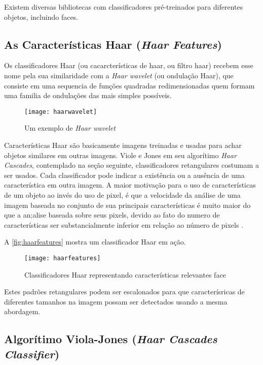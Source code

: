 Existem diversas bibliotecas com classificadores pré-treinados para diferentes objetos, incluindo faces.


\subsection{As Características Haar (\textit{Haar Features}) }\label{subsubsec:elem_haar}

Os classificadores Haar (ou cacarcterísticas de haar, ou filtro haar) recebem esse nome pela sua similaridade com a \textit{Haar wavelet} (ou ondulação Haar), que consiste em uma sequencia de funções quadradas redimensionadas quem formam uma familia de ondulações das mais simples possíveis.

 \begin{figure}[h]
 	\centering
 	\texttt{[image: haarwavelet]}
 	\caption{Um exemplo de \textit{Haar wavelet}}
 	\label{fig:haarwavelet}
 \end{figure}

Características Haar são basicamente imagens treinadas e usadas para achar objetos similares em outras imagens. Viole e Jones em seu algorítimo \textit{Haar Cascades}, contemplado na seção seguinte, classificadores retangulares costumam a ser usados. Cada classificador pode indicar a existência ou a ausência de uma característica em outra imagem. A maior motivação para o uso de características de um objeto ao invés do uso de pixel, é que a velocidade da análise de uma imagem baseada no conjunto de sua principais características é muito maior do que a an;alise baseada sobre seus pixels, devido ao fato do numero de características ser substancialmente inferior em relação ao número de pixels \cite{gustavo_cascata}.

A \autoref{fig:haarfeatures} mostra um classificador Haar em ação.

 \begin{figure}[h]
	\centering
	\texttt{[image: haarfeatures]}
	\caption{Classificadores Haar representando características relevantes face}
	\label{fig:haarfeatures}
\end{figure}

Estes padrões retangulares podem ser escalonados para que caracterísricas de diferentes tamanhos na imagem possam ser detectados usando a mesma abordagem.


\subsection{Algorítimo Viola-Jones (\textit{Haar Cascades Classifier}) }\label{subsubsec:violajones}

